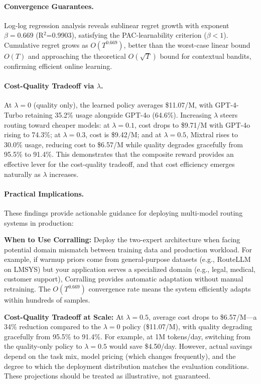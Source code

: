 \paragraph{Convergence Guarantees.}
Log-log regression analysis reveals sublinear regret growth with exponent $\beta=0.669$ (R$^2$=0.9903), satisfying the PAC-learnability criterion ($\beta < 1$).
Cumulative regret grows as $O(T^{0.669})$, better than the worst-case linear bound $O(T)$ and approaching the theoretical $O(\sqrt{T})$ bound for contextual bandits, confirming efficient online learning.

\paragraph{Cost-Quality Tradeoff via $\lambda$.}
At $\lambda=0$ (quality only), the learned policy averages \$11.07/M, with GPT-4-Turbo retaining 35.2\% usage alongside GPT-4o (64.6\%).
Increasing $\lambda$ steers routing toward cheaper models: at $\lambda=0.1$, cost drops to \$9.71/M with GPT-4o rising to 74.3\%; at $\lambda=0.3$, cost is \$9.42/M; and at $\lambda=0.5$, Mixtral rises to 30.0\% usage, reducing cost to \$6.57/M while quality degrades gracefully from 95.5\% to 91.4\%.
This demonstrates that the composite reward provides an effective lever for the cost-quality tradeoff, and that cost efficiency emerges naturally as $\lambda$ increases.

\paragraph{Practical Implications.}
These findings provide actionable guidance for deploying multi-model routing systems in production:

\textbf{When to Use Corralling:} Deploy the two-expert architecture when facing potential domain mismatch between training data and production workload. For example, if warmup priors come from general-purpose datasets (e.g., RouteLLM on LMSYS) but your application serves a specialized domain (e.g., legal, medical, customer support), Corralling provides automatic adaptation without manual retraining. The $O(T^{0.669})$ convergence rate means the system efficiently adapts within hundreds of samples.

\textbf{Cost-Quality Tradeoff at Scale:} At $\lambda=0.5$, average cost drops to \$6.57/M---a 34\% reduction compared to the $\lambda=0$ policy (\$11.07/M), with quality degrading gracefully from 95.5\% to 91.4\%.
For example, at 1M tokens/day, switching from the quality-only policy to $\lambda=0.5$ would save \$4.50/day. However, actual savings depend on the task mix, model pricing (which changes frequently), and the degree to which the deployment distribution matches the evaluation conditions. These projections should be treated as illustrative, not guaranteed.

